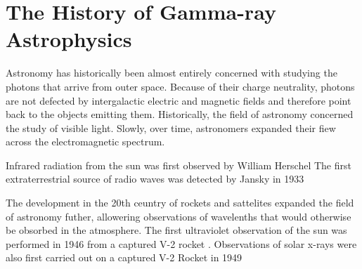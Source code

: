 
\section{The History of Gamma-ray Astrophysics}








Astronomy has historically been almost entirely concerned with studying
the photons that arrive from outer space.  Because of their charge
neutrality, photons are not defected by intergalactic electric and
magnetic fields and therefore point back to the objects 
emitting them. Historically, the field of astronomy concerned
the study of visible light.  Slowly, over time, astronomers 
expanded their fiew across the electromagnetic spectrum.

Infrared radiation from the sun was first observed by
William Herschel \citep{infrared_herschel_1800}
The first extraterrestrial source of radio waves was detected
by Jansky in 1933 \citep{radio_extraterrestrial_jansky_1933}

The development in the 20th ceuntry 
of rockets and sattelites expanded the field of astronomy
futher, allowering observations of wavelenths that would otherwise
be obsorbed in the atmosphere.
The first ultraviolet observation of the sun was performed in 1946
from a captured V-2 rocket \citep{ultraviolet_sun_baum_1946}.
Observations of solar x-rays were also first 
carried out on a captured V-2 Rocket in 1949 \citep{x_rays_burnight_1949}

